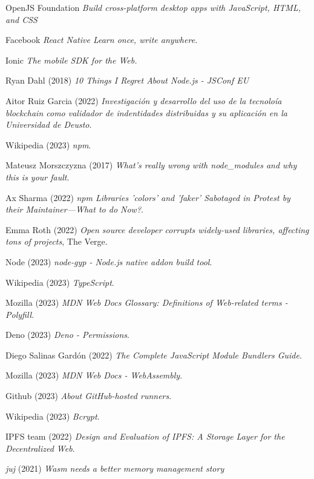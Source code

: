 \documentclass[12pt, letterpaper]{article}
\begin{document}
\begin{thebibliography}{9}
    OpenJS Foundation \emph{Build cross-platform desktop apps with JavaScript, HTML, and CSS}

    Facebook \emph{React Native Learn once, write anywhere.}

    Ionic \emph{The mobile SDK for the Web.}

    Ryan Dahl (2018) \emph{10 Things I Regret About Node.js - JSConf EU}

    Aitor Ruiz Garcia (2022) \emph{Investigación y desarrollo del uso de la tecnoloía blockchain como validador de indentidades distribuidas y su aplicación en la Universidad de Deusto}.

    Wikipedia (2023) \emph{npm}.

    Mateusz Morszczyzna (2017) \emph{What's really wrong with node\_modules and why this is your fault}.

    Ax Sharma (2022) \emph{npm Libraries 'colors' and 'faker' Sabotaged in Protest by their Maintainer—What to do Now?}.

    Emma Roth (2022) \emph{Open source developer corrupts widely-used libraries, affecting tons of projects}, The Verge.

    Node (2023) \emph{node-gyp - Node.js native addon build tool}.

    Wikipedia (2023) \emph{TypeScript}.

    Mozilla (2023) \emph{MDN Web Docs Glossary: Definitions of Web-related terms - Polyfill}.

    Deno (2023) \emph{Deno - Permissions}.

    Diego Salinas Gardón (2022) \emph{The Complete JavaScript Module Bundlers Guide}.

    Mozilla (2023) \emph{MDN Web Docs - WebAssembly}.

    Github (2023) \emph{About GitHub-hosted runners}.

    Wikipedia (2023) \emph{Bcrypt}.

    IPFS team (2022) \emph{Design and Evaluation of IPFS: A Storage Layer for the Decentralized Web}.

    \textit{juj} (2021) \emph{Wasm needs a better memory management story}



\end{thebibliography}
\end{document}
